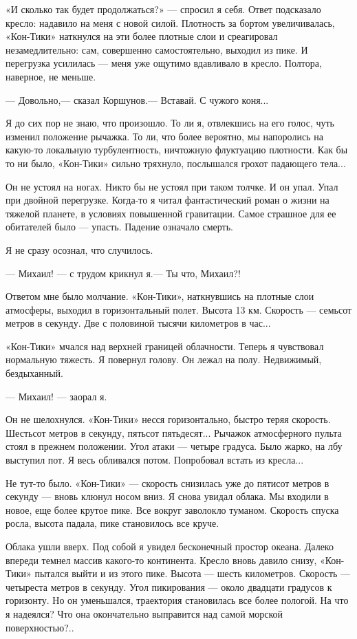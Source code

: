 \documentclass[11pt,a4paper,oneside]{article}
\begin{document}
«И сколько так будет продолжаться?» — спросил я себя. Ответ подсказало кресло: надавило на меня с новой силой. Плотность за бортом увеличивалась, «Кон-Тики» наткнулся на эти более плотные слои и среагировал незамедлительно: сам, совершенно самостоятельно, выходил из пике. И перегрузка усилилась — меня уже ощутимо вдавливало в кресло. Полтора, наверное, не меньше.

— Довольно,— сказал Коршунов.— Вставай. С чужого коня...

Я до сих пор не знаю, что произошло. То ли я, отвлекшись на его голос, чуть изменил положение рычажка. То ли, что более вероятно, мы напоролись на какую-то локальную турбулентность, ничтожную флуктуацию плотности. Как бы то ни было, «Кон-Тики» сильно тряхнуло, послышался грохот падающего тела...

Он не устоял на ногах. Никто бы не устоял при таком толчке. И он упал. Упал при двойной перегрузке. Когда-то я читал фантастический роман о жизни на тяжелой планете, в условиях повышенной гравитации. Самое страшное для ее обитателей было — упасть. Падение означало смерть.

Я не сразу осознал, что случилось.

— Михаил! — с трудом крикнул я.— Ты что, Михаил?!

Ответом мне было молчание. «Кон-Тики», наткнувшись на плотные слои атмосферы, выходил в горизонтальный полет. Высота 13 км. Скорость — семьсот метров в секунду. Две с половиной тысячи километров в час...

«Кон-Тики» мчался над верхней границей облачности. Теперь я чувствовал нормальную тяжесть. Я повернул голову. Он лежал на полу. Недвижимый, бездыханный.

— Михаил! — заорал я.

Он не шелохнулся. «Кон-Тики» несся горизонтально, быстро теряя скорость. Шестьсот метров в секунду, пятьсот пятьдесят... Рычажок атмосферного пульта стоял в прежнем положении. Угол атаки — четыре градуса. Было жарко, на лбу выступил пот. Я весь обливался потом. Попробовал встать из кресла...

Не тут-то было. «Кон-Тики» — скорость снизилась уже до пятисот метров в секунду — вновь клюнул носом вниз. Я снова увидал облака. Мы входили в новое, еще более крутое пике. Все вокруг заволокло туманом. Скорость спуска росла, высота падала, пике становилось все круче.

Облака ушли вверх. Под собой я увидел бесконечный простор океана. Далеко впереди темнел массив какого-то континента. Кресло вновь давило снизу, «Кон-Тики» пытался выйти и из этого пике. Высота — шесть километров. Скорость — четыреста метров в секунду. Угол пикирования — около двадцати градусов к горизонту. Но он уменьшался, траектория становилась все более пологой. На что я надеялся? Что она окончательно выправится над самой морской поверхностью?..
\end{document}
